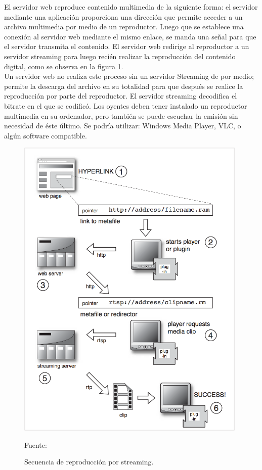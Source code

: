 El servidor web reproduce contenido multimedia de la siguiente forma: el servidor mediante una aplicación proporciona una dirección que permite acceder a un archivo multimedia por medio de un reproductor. Luego que se establece una conexión al servidor web mediante el mismo enlace, se manda una señal para que el servidor transmita el contenido. El servidor web redirige al reproductor a un servidor streaming para luego recién realizar la reproducción del contenido digital, como se observa en la figura \ref{fig:streamming}.\\

Un servidor web no realiza este proceso sin un servidor Streaming de por medio; permite la descarga del archivo en su totalidad para que después se realice la reproducción por parte del reproductor. El servidor streaming decodifica el bitrate en el que se codificó. Los oyentes deben tener instalado un reproductor multimedia en su ordenador, pero también se puede escuchar la emisión sin necesidad de éste último. Se podría utilizar: Windows Media Player, VLC, o algún software compatible.\\

\begin{figure}[H]
    \begin{center}
        \includegraphics[width=11cm]{img/capitulo_2/streamming.png}
    \end{center}
    \begin{center}
        \caption{Secuencia de reproducción por streaming.}
        Fuente: \cite{streamming:austerberry}
        \label{fig:streamming}
    \end{center}
\end{figure}

